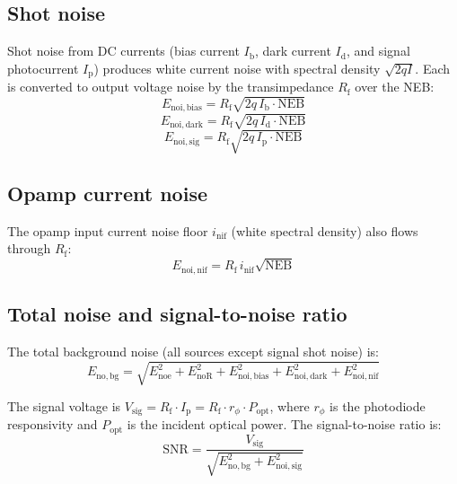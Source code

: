 \documentclass[a4paper,11pt]{article}
\begin{document}
\subsection{Shot noise}

Shot noise from DC currents (bias current $I_{\mathrm{b}}$, dark
current $I_{\mathrm{d}}$, and signal photocurrent $I_{\mathrm{p}}$)
produces white current noise with spectral density $\sqrt{2qI}$.  Each
is converted to output voltage noise by the transimpedance
$R_{\mathrm{f}}$ over the NEB:
\begin{equation}
  E_{\mathrm{noi,bias}}
  = R_{\mathrm{f}} \sqrt{2q\,I_{\mathrm{b}} \cdot \mathrm{NEB}}
  \label{eq:Enoi-bias}
\end{equation}
\begin{equation}
  E_{\mathrm{noi,dark}}
  = R_{\mathrm{f}} \sqrt{2q\,I_{\mathrm{d}} \cdot \mathrm{NEB}}
  \label{eq:Enoi-dark}
\end{equation}
\begin{equation}
  E_{\mathrm{noi,sig}}
  = R_{\mathrm{f}} \sqrt{2q\,I_{\mathrm{p}} \cdot \mathrm{NEB}}
  \label{eq:Enoi-sig}
\end{equation}

\subsection{Opamp current noise}

The opamp input current noise floor $i_{\mathrm{nif}}$ (white spectral
density) also flows through $R_{\mathrm{f}}$:
\begin{equation}
  E_{\mathrm{noi,nif}}
  = R_{\mathrm{f}} \, i_{\mathrm{nif}} \sqrt{\mathrm{NEB}}
  \label{eq:Enoi-nif}
\end{equation}

\subsection{Total noise and signal-to-noise ratio}

The total background noise (all sources except signal shot noise) is:
\begin{equation}
  E_{\mathrm{no,bg}}
  = \sqrt{E_{\mathrm{noe}}^2 + E_{\mathrm{noR}}^2
          + E_{\mathrm{noi,bias}}^2 + E_{\mathrm{noi,dark}}^2
          + E_{\mathrm{noi,nif}}^2}
  \label{eq:Eno-bg}
\end{equation}

The signal voltage is
$V_{\mathrm{sig}} = R_{\mathrm{f}} \cdot I_{\mathrm{p}}
= R_{\mathrm{f}} \cdot r_\phi \cdot P_{\mathrm{opt}}$, where
$r_\phi$ is the photodiode responsivity and $P_{\mathrm{opt}}$ is the
incident optical power.  The signal-to-noise ratio is:
\begin{equation}
  \mathrm{SNR}
  = \frac{V_{\mathrm{sig}}}
         {\sqrt{E_{\mathrm{no,bg}}^2 + E_{\mathrm{noi,sig}}^2}}
  \label{eq:snr}
\end{equation}
\end{document}
